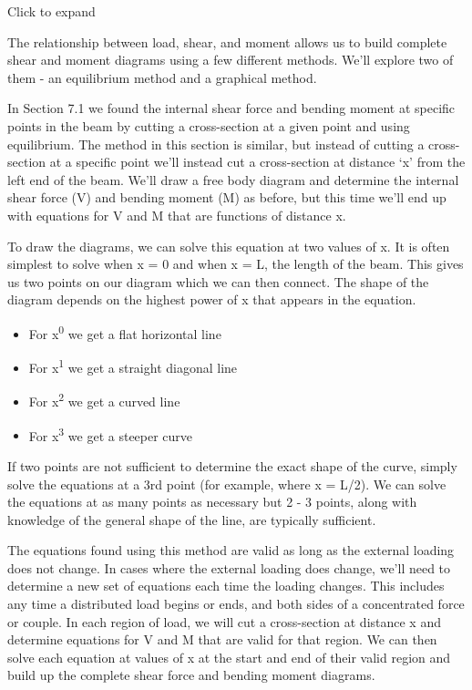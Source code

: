 \documentclass[
  letterpaper,
  DIV=11,
  numbers=noendperiod]{scrreprt}
\theoremstyle{definition}
\theoremstyle{remark}
\begin{document}
Click to expand

The relationship between load, shear, and moment allows us to build
complete shear and moment diagrams using a few different methods. We'll
explore two of them - an equilibrium method and a graphical method.

In Section 7.1 we found the internal shear force and bending moment at
specific points in the beam by cutting a cross-section at a given point
and using equilibrium. The method in this section is similar, but
instead of cutting a cross-section at a specific point we'll instead cut
a cross-section at distance `x' from the left end of the beam. We'll
draw a free body diagram and determine the internal shear force (V) and
bending moment (M) as before, but this time we'll end up with equations
for V and M that are functions of distance x.

To draw the diagrams, we can solve this equation at two values of x. It
is often simplest to solve when x = 0 and when x = L, the length of the
beam. This gives us two points on our diagram which we can then connect.
The shape of the diagram depends on the highest power of x that appears
in the equation.

\begin{itemize}
\item
  For x\textsuperscript{0} we get a flat horizontal line
\item
  For x\textsuperscript{1} we get a straight diagonal line
\item
  For x\textsuperscript{2} we get a curved line
\item
  For x\textsuperscript{3} we get a steeper curve
\end{itemize}

If two points are not sufficient to determine the exact shape of the
curve, simply solve the equations at a 3rd point (for example, where x =
L/2). We can solve the equations at as many points as necessary but 2 -
3 points, along with knowledge of the general shape of the line, are
typically sufficient.

The equations found using this method are valid as long as the external
loading does not change. In cases where the external loading does
change, we'll need to determine a new set of equations each time the
loading changes. This includes any time a distributed load begins or
ends, and both sides of a concentrated force or couple. In each region
of load, we will cut a cross-section at distance x and determine
equations for V and M that are valid for that region. We can then solve
each equation at values of x at the start and end of their valid region
and build up the complete shear force and bending moment diagrams.
\end{document}
